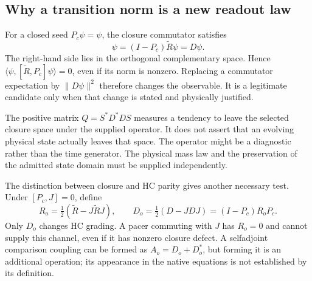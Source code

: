 \documentclass[11pt,a4paper]{article}
\begin{document}
\subsection{Why a transition norm is a new readout law}
For a closed seed $P_c\psi=\psi$, the closure commutator satisfies
\begin{equation}
 [\widetilde R,P_c]\psi=(I-P_c)\widetilde R\psi=D\psi.
\end{equation}
The right-hand side lies in the orthogonal complementary space. Hence
$\langle\psi,[\widetilde R,P_c]\psi\rangle=0$, even if its
norm is nonzero. Replacing a commutator expectation by
$\|D\psi\|^2$ therefore changes the observable. It is a legitimate
candidate only when that change is stated and physically justified.

The positive matrix $Q=S^*D^*DS$ measures a tendency to leave the
selected closure space under the supplied operator. It does not
assert that an evolving physical state actually leaves that space.
The operator might be a diagnostic rather than the time generator.
The physical mass law and the preservation of the admitted state
domain must be supplied independently.

The distinction between closure and HC parity gives another necessary
test. Under $[P_c,J]=0$, define
\begin{equation}
 R_o=\tfrac12(\widetilde R-J\widetilde RJ),\qquad
 D_o=\tfrac12(D-JDJ)=(I-P_c)R_oP_c.
\end{equation}
Only $D_o$ changes HC grading. A pacer commuting with $J$ has
$R_o=0$ and cannot supply this channel, even if it has nonzero
closure defect. A selfadjoint comparison coupling can be formed as
$A_o=D_o+D_o^*$, but forming it is an additional operation; its
appearance in the native equations is not established by its definition.
\end{document}
